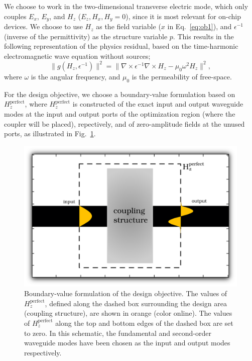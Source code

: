 \documentclass[letterpaper,10pt]{article}
\begin{document}
We choose to work in the two-dimensional transverse electric mode,
    which only couples $E_x$, $E_y$, and $H_z$ ($E_z, H_x, H_y = 0$),
    since it is most relevant for on-chip devices.
We choose to use $H_z$ as the field variable ($x$ in Eq.~\ref{eq:ob1}), 
    and $\epsilon^{-1}$ (inverse of the permittivity) 
    as the structure variable $p$.
This results in the following representation of the physics residual, 
    based on the time-harmonic electromagnetic wave equation without sources;
    \begin{equation}
    \|g(H_z, \epsilon^{-1})\|^2 = 
    \| \nabla \times \epsilon^{-1} \nabla \times H_z - \mu_0 \omega^2 H_z \|^2,
    \end{equation}
    where $\omega$ is the angular frequency,
    and $\mu_0$ is the permeability of free-space.

For the design objective, we choose a boundary-value formulation
    based on $H_z^\text{perfect}$,
    where $H_z^\text{perfect}$ is constructed 
    of the exact input and output waveguide modes at the input and output ports
    of the optimization region (where the coupler will be placed),
    repectively, and of zero-amplitude fields at the unused ports, 
    as illustrated in Fig.~\ref{fig:intro}.

\begin{figure}[htbp]
    \centering
    \includegraphics[width=\textwidth]{intro} 
    \caption{Boundary-value formulation of the design objective.
        The values of $H_z^\text{perfect}$, 
            defined along the dashed box surrounding the design area
            (coupling structure), 
            are shown in orange (color online).
        The values of $H_z^\text{perfect}$ along the top and bottom edges
            of the dashed box are set to zero.
        In this schematic, the fundamental and second-order waveguide modes
            have been chosen as the input and output modes respectively.}
    \label{fig:intro}
\end{figure}
\end{document}
